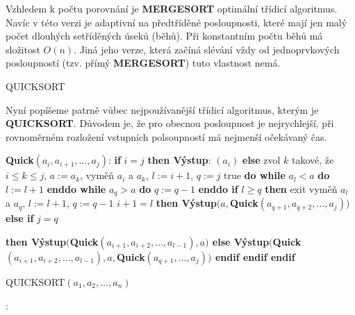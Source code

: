 \documentclass[a4paper,12pt]{article}
\begin{document}
Vzhledem k 
počtu porovnání je {\bf MERGESORT} optimální třídicí algoritmus. 
Navíc v této verzi je adaptivní na předtříděné 
posloupnosti, které mají jen malý počet dlouhých 
setříděných úseků (běhů). Při 
konstantním počtu běhů má složitost $O(n)$. Jiná 
jeho verze, která začíná slévání vždy od 
jednoprvkových posloupností (tzv. přímý {\bf MERGESORT}) 
tuto vlastnost nemá. 

\head
QUICKSORT
\endhead

Nyní popíšeme patrně vůbec 
nejpoužívanější třídicí algoritmus, kterým je {\bf QUICKSORT}. 
Důvodem je, že pro obecnou posloupnost je 
nejrychlejší, při rovnoměrném rozložení vstupních 
polsoupností má nejmenší očekávaný čas. 

{\bf Quick$(a_i,a_{i+1},\dots,a_j)$}:\newline 
{\bf if} $i=j$ {\bf then\newline 
\phantom{{\rm ---}}Výstup}: $(a_i)$\newline 
{\bf else\newline 
\phantom{{\rm ---}}}zvol $k$ takové, že $i\le k\le j$, $a:=a_k$, 
vyměň $a_i$ a $a_k$, $l:=i+1$, $q:=j$\newline 
\phantom{---}{\bf while} true {\bf do\newline 
\phantom{{\rm ------}}while} $a_l<a$ {\bf do} $l:=l+1$ {\bf enddo\newline 
\phantom{{\rm ------}}while} $a_q>a$ {\bf do} $q:=q-1$ {\bf enddo\newline 
\phantom{{\rm ------}}if} $l\ge q$ {\bf then\newline 
\phantom{{\rm ---------}}}exit\newline 
{}vyměň $a_l$ a $a_q$, $l:=l+1$, $q
:=q-1$\newline 
{} $i+1=l$ {\bf then\newline 
\phantom{{\rm ------}}Výstup$(a,$Quick$(a_{q+1},a_{q+2},\dots,a_
j))$\newline 
\phantom{{\rm ---}}else\newline 
\phantom{{\rm ------}}if} $j=q$ {\bf then\newline 
\phantom{{\rm ---------}}Výstup$($Quick$(a_{i+1},a_{i+2},\dots,
a_{l-1}),a)$\newline 
\phantom{{\rm ------}}else\newline 
\phantom{{\rm ---------}}Výstup$($Quick$(a_{i+1},a_{i+2},\dots,
a_{l-1}),a,$Quick$(a_{q+1},\dots,a_j))$\newline 
\phantom{{\rm ------}}endif\newline 
\phantom{{\rm ---}}endif\newline 
endif

QUICKSORT$(a_1,a_2,\dots,a_n)$}:\newline 
\end{document}
